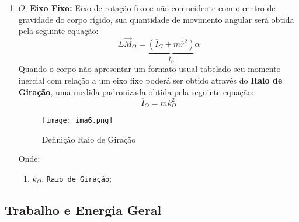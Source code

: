 \documentclass{article}
\begin{document}
\begin{enumerate}[rightmargin = \leftmargin]
                    \item $O$, \textbf{Eixo Fixo:} Eixo de rotação fixo e não conincidente com o centro de gravidade do corpo rígido, sua quantidade de movimento angular será obtida pela seguinte equação:
                        \begin{equation}
                            \boxed{
                                \Sigma\vec{M}_{O} = 
                                \underbrace{
                                    (\overline{I}_{G} + m\overline{r}^{2})
                                }_{\overline{I}_{O}}
                                \alpha
                            }
                        \end{equation}
                    Quando o corpo não apresentar um formato usual tabelado seu momento inercial com relação a um eixo fixo poderá ser obtido através do \textbf{Raio de Giração}, uma medida padronizada obtida pela seguinte equação:
                        \begin{equation}
                            \boxed{
                                \overline{I}_{O} = 
                                m k^{2}_{O}
                            }
                        \end{equation}
                        \begin{figure}[H]
                            \centering
                            \texttt{[image: ima6.png]}
                            \caption{Definição Raio de Giração}
                        \end{figure}\noindent
                    Onde:
                        \begin{enumerate}[rightmargin = \leftmargin, noitemsep]
                            \item $k_{O}$, \texttt{Raio de Giração};
                        \end{enumerate}
                \end{enumerate}

        \subsection{Trabalho e Energia Geral}
\end{document}
